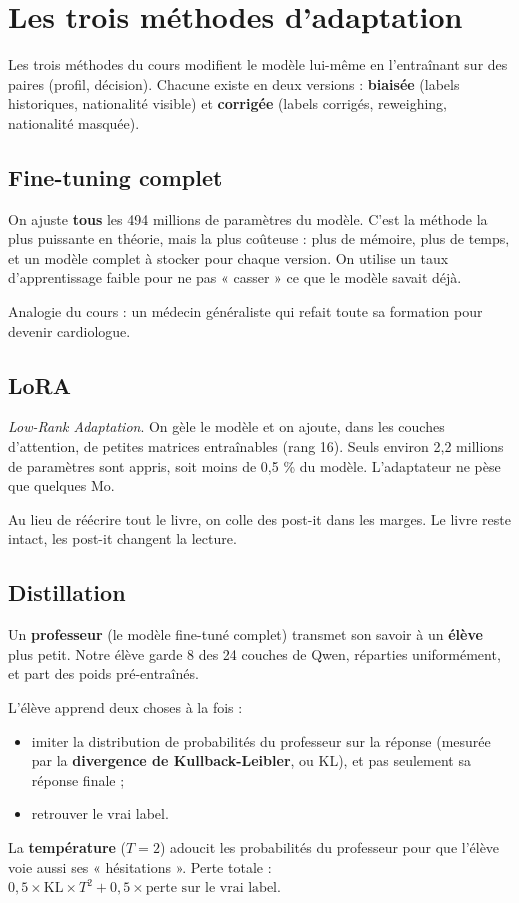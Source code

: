 \documentclass[11pt,a4paper]{article}
\begin{document}
\section{Les trois méthodes d'adaptation}
Les trois méthodes du cours modifient le modèle lui-même en l'entraînant sur des paires (profil, décision). Chacune existe en deux versions : \textbf{biaisée} (labels historiques, nationalité visible) et \textbf{corrigée} (labels corrigés, reweighing, nationalité masquée).

\subsection{Fine-tuning complet}
On ajuste \textbf{tous} les 494 millions de paramètres du modèle. C'est la méthode la plus puissante en théorie, mais la plus coûteuse : plus de mémoire, plus de temps, et un modèle complet à stocker pour chaque version. On utilise un taux d'apprentissage faible pour ne pas « casser » ce que le modèle savait déjà.

\begin{simple}
Analogie du cours : un médecin généraliste qui refait toute sa formation pour devenir cardiologue.
\end{simple}

\subsection{LoRA}
\emph{Low-Rank Adaptation}. On gèle le modèle et on ajoute, dans les couches d'attention, de petites matrices entraînables (rang 16). Seuls environ 2,2 millions de paramètres sont appris, soit moins de 0,5 \% du modèle. L'adaptateur ne pèse que quelques Mo.

\begin{simple}
Au lieu de réécrire tout le livre, on colle des post-it dans les marges. Le livre reste intact, les post-it changent la lecture.
\end{simple}

\subsection{Distillation}
Un \textbf{professeur} (le modèle fine-tuné complet) transmet son savoir à un \textbf{élève} plus petit. Notre élève garde 8 des 24 couches de Qwen, réparties uniformément, et part des poids pré-entraînés.

L'élève apprend deux choses à la fois :
\begin{itemize}
  \item imiter la distribution de probabilités du professeur sur la réponse (mesurée par la \textbf{divergence de Kullback-Leibler}, ou KL), et pas seulement sa réponse finale ;
  \item retrouver le vrai label.
\end{itemize}
La \textbf{température} ($T = 2$) adoucit les probabilités du professeur pour que l'élève voie aussi ses « hésitations ». Perte totale : $0{,}5 \times \text{KL} \times T^2 + 0{,}5 \times \text{perte sur le vrai label}$.
\end{document}
